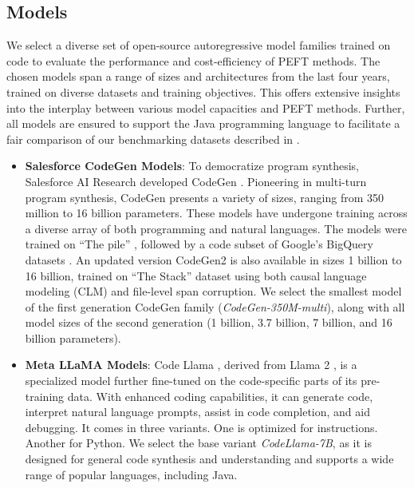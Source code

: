 \documentclass[12pt]{book}
\begin{document}
\subsection{Models}
\label{sec:models}
We select a diverse set of open-source autoregressive model families trained on code to evaluate the performance and cost-efficiency of PEFT methods. The chosen models span a range of sizes and architectures from the last four years, trained on diverse datasets and training objectives. This offers extensive insights into the interplay between various model capacities and PEFT methods. Further, all models are ensured to support the Java programming language to facilitate a fair comparison of our benchmarking datasets described in .

\begin{itemize}
\item \textbf{Salesforce CodeGen Models}: To democratize program synthesis, Salesforce AI Research developed CodeGen \citep{nijkamp2022codegen}. Pioneering in multi-turn program synthesis, CodeGen presents a variety of sizes, ranging from 350 million to 16 billion parameters. These models have undergone training across a diverse array of both programming and natural languages. The models were trained on ``The pile'' \citep{gao2020pile}, followed by a code subset of Google's BigQuery datasets \citep{GoogleBigQuery}. An updated version CodeGen2 \citep{nijkamp2023codegen2} is also available in sizes 1 billion to 16 billion, trained on ``The Stack'' dataset \citep{Kocetkov2022TheStack} using both causal language modeling (CLM) and file-level span corruption. We select the smallest model of the first generation CodeGen family (\textit{CodeGen-350M-multi}), along with all model sizes of the second generation (1 billion, 3.7 billion, 7 billion, and 16 billion parameters).

\item \textbf{Meta LLaMA Models}: Code Llama \citep{Rozire2023CodeLO}, derived from Llama 2 \citep{Touvron2023Llama2O}, is a specialized model further fine-tuned on the code-specific parts of its pre-training data. With enhanced coding capabilities, it can generate code, interpret natural language prompts, assist in code completion, and aid debugging. It comes in three variants. One is optimized for instructions. Another for Python. We select the base variant \textit{CodeLlama-7B}, as it is designed for general code synthesis and understanding and supports a wide range of popular languages, including Java.


\end{itemize}
\end{document}
